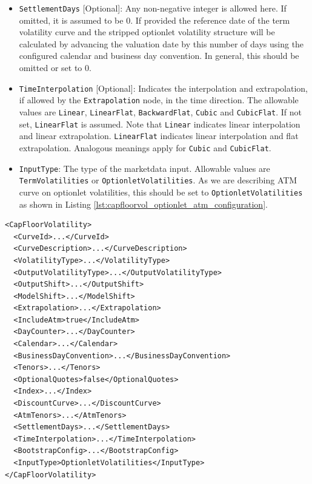 \begin{itemize}
\item \lstinline!SettlementDays! [Optional]:
Any non-negative integer is allowed here. If omitted, it is assumed to be 0. If provided the reference date of the term volatility curve and the stripped optionlet volatility structure will be calculated by advancing the valuation date by this number of days using the configured calendar and business day convention. In general, this should be omitted or set to 0.

\item \lstinline!TimeInterpolation! [Optional]:
Indicates the interpolation and extrapolation, if allowed by the \lstinline!Extrapolation! node, in the time direction. The allowable values are \lstinline!Linear!, \lstinline!LinearFlat!, \lstinline!BackwardFlat!, \lstinline!Cubic! and \lstinline!CubicFlat!. If not set, \lstinline!LinearFlat! is assumed. Note that \lstinline!Linear! indicates linear interpolation and linear extrapolation. \lstinline!LinearFlat! indicates linear interpolation and flat extrapolation. Analogous meanings apply for \lstinline!Cubic! and \lstinline!CubicFlat!.

\item \lstinline!InputType!:
The type of the marketdata input. Allowable values are \lstinline!TermVolatilities! or \lstinline!OptionletVolatilities!. As we are describing ATM curve on optionlet volatilities, this should be set to \lstinline!OptionletVolatilities! as shown in Listing \ref{lst:capfloorvol_optionlet_atm_configuration}.

\end{itemize}

\begin{longlisting}
\begin{verbatim}
<CapFloorVolatility>
  <CurveId>...</CurveId>
  <CurveDescription>...</CurveDescription>
  <VolatilityType>...</VolatilityType>
  <OutputVolatilityType>...</OutputVolatilityType>
  <OutputShift>...</OutputShift>
  <ModelShift>...</ModelShift>
  <Extrapolation>...</Extrapolation>
  <IncludeAtm>true</IncludeAtm>
  <DayCounter>...</DayCounter>
  <Calendar>...</Calendar>
  <BusinessDayConvention>...</BusinessDayConvention>
  <Tenors>...</Tenors>
  <OptionalQuotes>false</OptionalQuotes>
  <Index>...</Index>
  <DiscountCurve>...</DiscountCurve>
  <AtmTenors>...</AtmTenors>
  <SettlementDays>...</SettlementDays>
  <TimeInterpolation>...</TimeInterpolation>
  <BootstrapConfig>...</BootstrapConfig>
  <InputType>OptionletVolatilities</InputType>
</CapFloorVolatility>
\end{verbatim}
\caption{ATM cap floor configuration with optionlet volatilities input.}
\label{lst:capfloorvol_optionlet_atm_configuration}
\end{longlisting}

